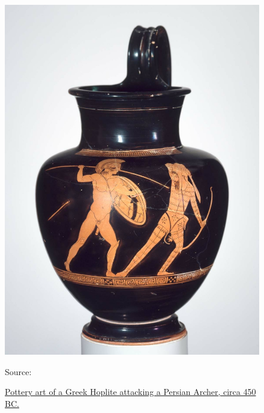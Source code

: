 \documentclass[twoside, a4paper, 12pt]{article}
\newcommand{\source}[1]{\caption*{Source: {#1}} }
\begin{document}
\begin{figure}
  \centering
  \includegraphics[width=\linewidth]{HopliteArcher.jpg}
  \captionsetup{justification=raggedleft}
  \caption{\ul{ Pottery art of a Greek Hoplite attacking a Persian Archer, circa 450 BC.}}
  \source{\cite{MFABoston_2017_hoplite}}
  \label{img:HopliteArcher}
\end{figure}
\end{document}
